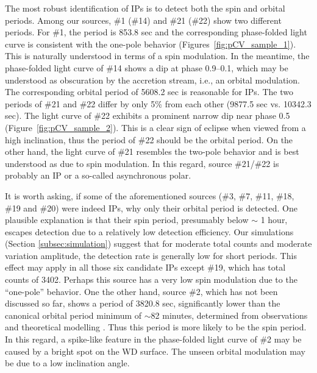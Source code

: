 \documentclass[fleqn,usenatbib]{mnras}
\begin{document}
The most robust identification of IPs is to detect both the spin and orbital periods. Among our sources, \#1 (\#14) and \#21 (\#22) show two different periods.
For \#1, the period is 853.8 sec and the corresponding phase-folded light curve is consistent with the one-pole behavior (Figures~\ref{fig:pCV_sample_1}). This is naturally understood in terms of a spin modulation. 
In the meantime, the phase-folded light curve of \#14 shows a dip at phase 0.9--0.1, which may be understood as obscuration by the accretion stream, i.e., an orbital modulation. The corresponding orbital period of 5608.2 sec is reasonable for IPs. 
The two periods of \#21 and \#22 differ by only 5\% from each other (9877.5 sec vs. 10342.3 sec).
The light curve of \#22 exhibits a prominent narrow dip near phase 0.5 (Figure~\ref{fig:pCV_sample_2}). This is a clear sign of eclipse when viewed from a high inclination, thus the period of \#22 should be the orbital period. 
On the other hand, the light curve of \#21 resembles the two-pole behavior and is best understood as due to spin modulation. 
In this regard, source \#21/\#22 is probably an IP or a so-called asynchronous polar. 

It is worth asking, if some of the aforementioned sources (\#3, \#7, \#11, \#18, \#19 and \#20) were indeed IPs, why only their orbital period is detected. One plausible explanation is that their spin period, presumably below $\sim$ 1 hour, escapes detection due to a relatively low detection efficiency. Our simulations (Section \ref{subsec:simulation}) suggest that for moderate total counts and moderate variation amplitude, the detection rate is generally low for short periods. This effect may apply in all those six candidate IPs except \#19, which has total counts of 3402. Perhaps this source has a very low spin modulation due to the ``one-pole'' behavior.
One the other hand, source \#2, which has not been discussed so far, shows a period of 3820.8 sec, significantly lower than the canonical orbital period minimum of $\sim$82 minutes, determined from observations \citep{2009MNRAS.397.2170G} and theoretical modelling \citep{2011ApJS..194...28K}. %
Thus this period is more likely to be the spin period.
In this regard, a spike-like feature in the phase-folded light curve of \#2 may be caused by a bright spot on the WD surface. 
The unseen orbital modulation may be due to a low inclination angle. 
\end{document}
